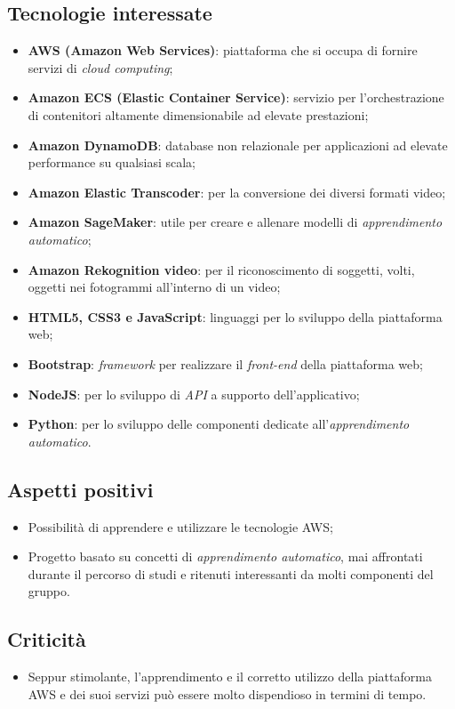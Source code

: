 \subsection{Tecnologie interessate}
\begin{itemize}
	\item \textbf{AWS (Amazon Web Services)}: piattaforma che si occupa di fornire servizi di \textit{cloud computing\glos};
	\item \textbf{Amazon ECS (Elastic Container Service)}: servizio per l'orchestrazione di contenitori altamente dimensionabile ad elevate	prestazioni;
	\item \textbf{Amazon DynamoDB}:  database non relazionale per applicazioni ad elevate performance su qualsiasi scala;
	\item \textbf{Amazon Elastic Transcoder}: per la conversione dei diversi formati video;
	\item \textbf{Amazon SageMaker}: utile per creare e allenare modelli di \textit{apprendimento automatico\glos};
	\item \textbf{Amazon Rekognition video}: per il riconoscimento di soggetti, volti, oggetti nei fotogrammi all'interno di un video;
	\item \textbf{HTML5, CSS3 e JavaScript}: linguaggi per lo sviluppo della piattaforma web;
	\item \textbf{Bootstrap}: \textit{framework\glo} per realizzare il \textit{front-end\glo} della piattaforma web;
	\item \textbf{NodeJS}: per lo sviluppo di \textit{API\glo} a supporto dell'applicativo;
	\item \textbf{Python\glos}: per lo sviluppo delle componenti dedicate all'\textit{apprendimento automatico}\glos.
\end{itemize}

\subsection{Aspetti positivi}
\begin{itemize}
	\item Possibilità di apprendere e utilizzare le tecnologie AWS;
	\item Progetto basato su concetti di \textit{apprendimento automatico}\glos, mai affrontati durante il percorso di studi e ritenuti interessanti da molti componenti del gruppo.
\end{itemize}

\subsection{Criticità}
\begin{itemize}
	\item Seppur stimolante, l'apprendimento e il corretto utilizzo della piattaforma AWS e dei suoi servizi può essere molto dispendioso in termini di tempo.
	
\end{itemize}

